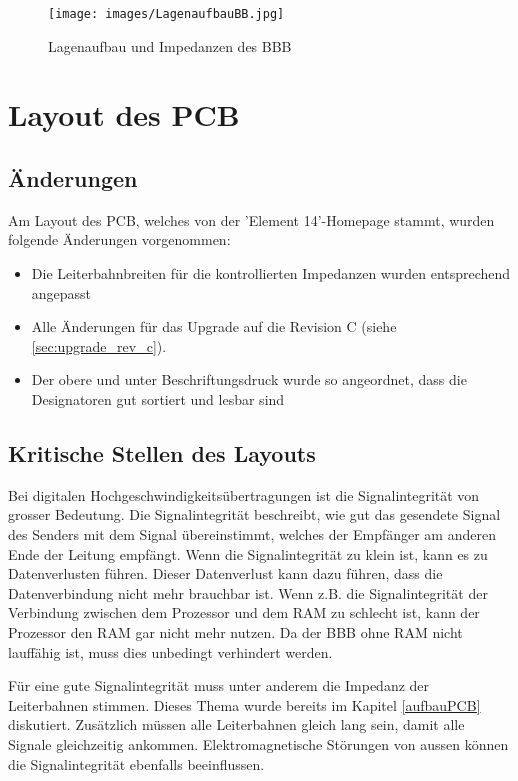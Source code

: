 \begin{figure}[!ht]
\centering
\texttt{[image: images/LagenaufbauBB.jpg]}
\caption{Lagenaufbau und Impedanzen des BBB}
\label{LagenaufbauBB}
\end{figure}


\section{Layout des PCB}

\subsection{Änderungen}
Am Layout des PCB, welches von der 'Element 14'-Homepage stammt, wurden folgende Änderungen vorgenommen:

\begin{itemize}
\item Die Leiterbahnbreiten für die kontrollierten Impedanzen wurden entsprechend angepasst
\item Alle Änderungen für das Upgrade auf die Revision C (siehe \ref{sec:upgrade_rev_c}).
\item Der obere und unter Beschriftungsdruck wurde so angeordnet, dass die Designatoren gut sortiert und lesbar sind
\end{itemize}


\subsection{Kritische Stellen des Layouts}
Bei digitalen Hochgeschwindigkeitsübertragungen ist die Signalintegrität von grosser Bedeutung. Die Signalintegrität beschreibt, wie gut das gesendete Signal des Senders mit dem Signal übereinstimmt, welches der Empfänger am anderen Ende der Leitung empfängt. Wenn die Signalintegrität zu klein ist, kann es zu Datenverlusten führen. Dieser Datenverlust kann dazu führen, dass die Datenverbindung nicht mehr brauchbar ist. Wenn z.B. die Signalintegrität der Verbindung zwischen dem Prozessor und dem RAM zu schlecht ist, kann der Prozessor den RAM gar nicht mehr nutzen. Da der BBB ohne RAM nicht lauffähig ist, muss dies unbedingt verhindert werden.

Für eine gute Signalintegrität muss unter anderem die Impedanz der Leiterbahnen stimmen. Dieses Thema wurde bereits im Kapitel \ref{aufbauPCB} diskutiert. Zusätzlich müssen alle Leiterbahnen gleich lang sein, damit alle Signale gleichzeitig ankommen. Elektromagnetische Störungen von aussen können die Signalintegrität ebenfalls beeinflussen.

